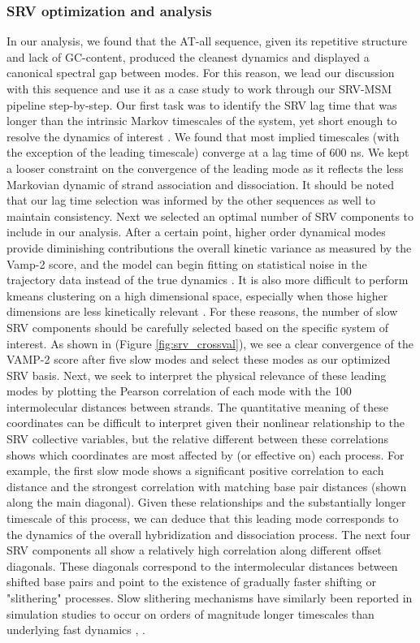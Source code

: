 \documentclass[journal=jpcbfk,manuscript=article]{achemso}
\begin{document}
\subsubsection{\label{sec:Results}SRV optimization and analysis}

In our analysis, we found that the AT-all sequence, given its repetitive structure and lack of GC-content, produced the cleanest dynamics and displayed a canonical spectral gap between modes. For this reason, we lead our discussion with this sequence and use it as a case study to work through our SRV-MSM pipeline step-by-step. Our first task was to identify the SRV lag time that was longer than the intrinsic Markov timescales of the system, yet short enough to resolve the dynamics of interest \citep{Phys2018MarkovValidation}. We found that most implied timescales (with the exception of the leading timescale) converge at a lag time of 600 ns. We kept a looser constraint on the convergence of the leading mode as it reflects the less Markovian dynamic of strand association and dissociation. It should be noted that our lag time selection was informed by the other sequences as well to maintain consistency. Next we selected an optimal number of SRV components to include in our analysis. After a certain point, higher order dynamical modes provide diminishing contributions the overall kinetic variance as measured by the Vamp-2 score, and the model can begin fitting on statistical noise in the trajectory data instead of the true dynamics \citep{McGibbon2015VariationalKinetics}. It is also more difficult to perform kmeans clustering on a high dimensional space, especially when those higher dimensions are less kinetically relevant \citep{Pande2010EverythingAsk}. For these reasons, the number of slow SRV components should be carefully selected based on the specific system of interest. As shown in (Figure \ref{fig:srv_crossval}), we see a clear convergence of the VAMP-2 score after five slow modes and select these modes as our optimized SRV basis. Next, we seek to interpret the physical relevance of these leading modes by plotting the Pearson correlation of each mode with the 100 intermolecular distances between strands. The quantitative meaning of these coordinates can be difficult to interpret given their nonlinear relationship to the SRV collective variables, but the relative different between these correlations shows which coordinates are most affected by (or effective on) each process. For example, the first slow mode shows a significant positive correlation to each distance and the strongest correlation with matching base pair distances (shown along the main diagonal). Given these relationships and the substantially longer timescale of this process, we can deduce that this leading mode corresponds to the dynamics of the overall hybridization and dissociation process. The next four SRV components all show a relatively high correlation along different offset diagonals. These diagonals correspond to the intermolecular distances between shifted base pairs and point to the existence of gradually faster shifting or "slithering" processes. Slow slithering mechanisms have similarly been reported in simulation studies to occur on orders of magnitude longer timescales than underlying fast dynamics \citep{Markegard2015}, \citep{Xiao2019}. 
\end{document}
